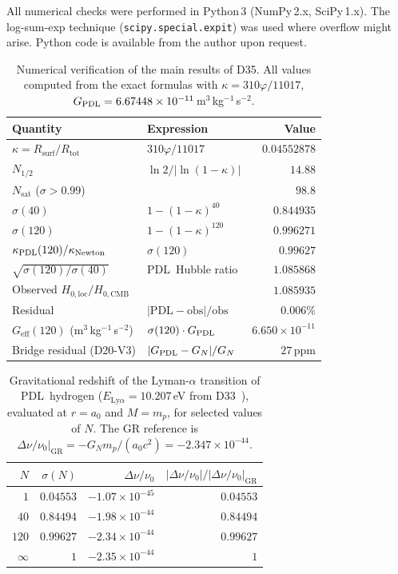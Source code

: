 \documentclass[11pt,a4paper]{article}
\theoremstyle{definition}
\newcommand{\PDL}{\textnormal{PDL}}
\newcommand{\Rsurf}{R_{\mathrm{surf}}}
\newcommand{\Rtot}{R_{\mathrm{tot}}}
\newcommand{\vp}{\varphi}
\newcommand{\GPDL}{G_{\PDL}}
\newcommand{\Geff}{G_{\mathrm{eff}}}
\newcommand{\sig}{\sigma}
\newcommand{\kap}{\kappa}
\newcommand{\kPDL}{\kappa_{\PDL}}
\begin{document}
All numerical checks were performed in Python\,3 (NumPy\,2.x, SciPy\,1.x). The log-sum-exp technique (\texttt{scipy.special.expit}) was used where overflow might arise. Python code is available from the author upon request.

\begin{table}[ht]
\centering
\caption{Numerical verification of the main results of D35. All values computed from the exact formulas with $\kap = 310\vp/11017$, $\GPDL = 6.67448\times10^{-11}$\,m$^3$\,kg$^{-1}$\,s$^{-2}$.}
\label{tab:numerics}
\begin{tabular}{llr}
\toprule
Quantity & Expression & Value \\
\midrule
$\kap = \Rsurf/\Rtot$ & $310\vp/11017$ & $0.04552878$ \\
$N_{1/2}$ & $\ln 2/|\ln(1-\kap)|$ & $14.88$ \\
$N_{\mathrm{sat}}$ ($\sig > 0.99$) & & $98.8$ \\
$\sig(40)$ & $1-(1-\kap)^{40}$ & $0.844935$ \\
$\sig(120)$ & $1-(1-\kap)^{120}$ & $0.996271$ \\
$\kPDL(120)/\kappa_{\mathrm{Newton}}$ & $\sig(120)$ & $0.99627$ \\
$\sqrt{\sig(120)/\sig(40)}$ & \PDL\ Hubble ratio & $1.085868$ \\
Observed $H_{0,\mathrm{loc}}/H_{0,\mathrm{CMB}}$ & & $1.085935$ \\
Residual & $|\mathrm{PDL} - \mathrm{obs}|/\mathrm{obs}$ & $0.006\%$ \\
$\Geff(120)$ (m$^3$\,kg$^{-1}$\,s$^{-2}$) & $\sig(120)\cdot\GPDL$ & $6.650\times10^{-11}$ \\
Bridge residual (D20-V3) & $|\GPDL - G_N|/G_N$ & $27\,\mathrm{ppm}$ \\
\bottomrule
\end{tabular}
\end{table}

\begin{table}[ht]
\centering
\caption{Gravitational redshift of the Lyman-$\alpha$ transition of \PDL\ hydrogen ($E_{\mathrm{Ly}\alpha} = 10.207$\,eV from D33~\cite{PDL_D33_2026}), evaluated at $r = a_0$ and $M = m_p$, for selected values of $N$. The GR reference is $\Delta\nu/\nu_0\big|_{\mathrm{GR}} = -G_N m_p/(a_0 c^2) = -2.347\times10^{-44}$.}
\label{tab:redshift}
\begin{tabular}{rrrr}
\toprule
$N$ & $\sig(N)$ & $\Delta\nu/\nu_0$ & $|\Delta\nu/\nu_0|/|\Delta\nu/\nu_0|_{\mathrm{GR}}$ \\
\midrule
$1$ & $0.04553$ & $-1.07\times10^{-45}$ & $0.04553$ \\
$40$ & $0.84494$ & $-1.98\times10^{-44}$ & $0.84494$ \\
$120$ & $0.99627$ & $-2.34\times10^{-44}$ & $0.99627$ \\
$\infty$ & $1$ & $-2.35\times10^{-44}$ & $1$ \\
\bottomrule
\end{tabular}
\end{table}
\end{document}
